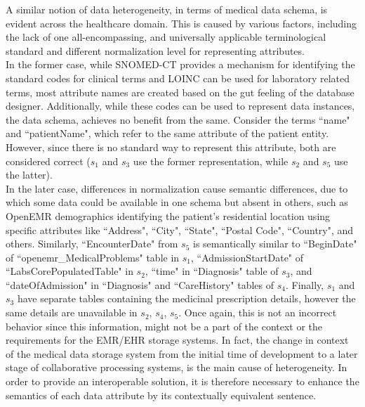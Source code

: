 \documentclass{ieeeaccess}
\begin{document}
A similar notion of data heterogeneity, in terms of medical data schema, is evident across the healthcare domain. This is caused by various factors, including the lack of one all-encompassing, and universally applicable terminological standard and different normalization level for representing attributes.\\
In the former case, while SNOMED-CT provides a mechanism for identifying the standard codes for clinical terms and LOINC can be used for laboratory related terms, most attribute names are created based on the gut feeling of the database designer. Additionally, while these codes can be used to represent data instances, the data schema, achieves no benefit from the same.  Consider the terms ``name" and ``patientName", which refer to the same attribute of the patient entity.  However, since there is no standard way to represent this attribute, both are considered correct ($s_1$ and $s_3$ use the former representation, while $s_2$ and $s_5$ use the latter).\\
In the later case, differences in normalization cause semantic differences, due to which some data could be available in one schema but absent in others, such as OpenEMR demographics identifying the patient's residential location using specific attributes like ``Address", ``City", ``State", ``Postal Code", ``Country", and others. Similarly, ``EncounterDate" from $s_5$ is semantically similar to ``BeginDate" of ``openemr\_MedicalProblems" table in $s_1$, ``AdmissionStartDate" of ``LabsCorePopulatedTable" in $s_2$, 
``time" in ``Diagnosis" table of $s_3$, and  ``dateOfAdmission" in ``Diagnosis" and ``CareHistory" tables of $s_4$.
Finally, $s_1$ and $s_3$ have separate tables containing the medicinal prescription details, however the same details are unavailable in $s_2$, $s_4$, $s_5$. Once again, this is not an incorrect behavior since this information, might not be a part of the context or the requirements for the EMR/EHR storage systems.
In fact, the change in context of the medical data storage system from the initial time of development to a later stage of collaborative processing systems, is the main cause of heterogeneity. In order to provide an interoperable solution, it is therefore necessary to enhance the semantics of each data attribute by its contextually equivalent sentence. 
\end{document}
